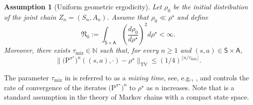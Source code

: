 \documentclass{article}
\theoremstyle{definition}
\theoremstyle{remark}
\theoremstyle{plain}
\newtheorem{assumption}[proposition]{Assumption}
\newcommand{\MKQ}{\mathrm{P}}
\newcommand{\tmix}{\tau_{\mathrm{mix}}}
\numberwithin{equation}{section}
\begin{document}
\begin{assumption}[Uniform geometric ergodicity]
\label{assum:UGE}
Let \(\rho_0\) be the initial distribution of the joint chain
\(Z_n=(S_n,A_n)\). Assume that \(\rho_0\ll\rho^\star\) and define
\begin{equation}
\label{eq:initial-density-ratio}
    \mathfrak N_0
    :=
    \int_{\mathsf S\times\mathsf A}
    \left(
        \frac{d\rho_0}{d\rho^\star}
    \right)^2
    d\rho^\star
    <\infty.
\end{equation}
Moreover, there exists $\tmix\in\mathbb N$ such that, for every $n\geq1$ and $(s,a)\in\mathsf S\times\mathsf A$,
\begin{equation}
\label{eq:tv_ergodicity-as}
    \Big\|\big( \MKQ^{\pi^\star}\big)^n((s,a),\cdot)-\rho^\star\Big\|_{\operatorname{TV}}
    \leq
    (1/4)^{\lfloor n/\tmix\rfloor}.
\end{equation}
\end{assumption}
The parameter $\tmix$ in  is referred to as a \emph{mixing time}, see, e.g., \cite{paulin2015concentration}, and controls the rate of convergence of the iterates $\big(\MKQ^{\pi^\star}\big)^n$ to $\rho^\star$ as $n$ increases. Note that  is a standard assumption in the theory of Markov chains with a compact state space.
\end{document}
